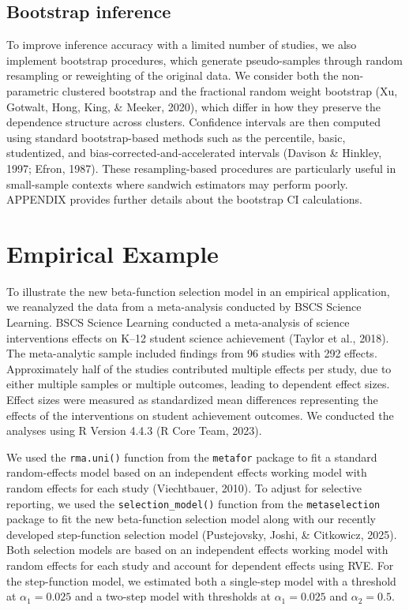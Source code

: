 \documentclass[
  american,
  man, donotrepeattitle,floatsintext]{apa7}
\begin{document}
\subsection{Bootstrap inference}\label{bootstrap-inference}

To improve inference accuracy with a limited number of studies, we also implement bootstrap procedures, which generate pseudo-samples through random resampling or reweighting of the original data. We consider both the non-parametric clustered bootstrap and the fractional random weight bootstrap (Xu, Gotwalt, Hong, King, \& Meeker, 2020), which differ in how they preserve the dependence structure across clusters. Confidence intervals are then computed using standard bootstrap-based methods such as the percentile, basic, studentized, and bias-corrected-and-accelerated intervals (Davison \& Hinkley, 1997; Efron, 1987). These resampling-based procedures are particularly useful in small-sample contexts where sandwich estimators may perform poorly. APPENDIX provides further details about the bootstrap CI calculations.

\section{Empirical Example}\label{empirical-example}

To illustrate the new beta-function selection model in an empirical application, we reanalyzed the data from a meta-analysis conducted by BSCS Science Learning. BSCS Science Learning conducted a meta-analysis of science interventions effects on K--12 student science achievement (Taylor et al., 2018). The meta-analytic sample included findings from 96 studies with 292 effects. Approximately half of the studies contributed multiple effects per study, due to either multiple samples or multiple outcomes, leading to dependent effect sizes. Effect sizes were measured as standardized mean differences representing the effects of the interventions on student achievement outcomes. We conducted the analyses using R Version 4.4.3 (R Core Team, 2023).

We used the \texttt{rma.uni()} function from the \texttt{metafor} package to fit a standard random-effects model based on an independent effects working model with random effects for each study (Viechtbauer, 2010). To adjust for selective reporting, we used the \texttt{selection\_model()} function from the \texttt{metaselection} package to fit the new beta-function selection model along with our recently developed step-function selection model (Pustejovsky, Joshi, \& Citkowicz, 2025). Both selection models are based on an independent effects working model with random effects for each study and account for dependent effects using RVE. For the step-function model, we estimated both a single-step model with a threshold at \(\alpha_1 = 0.025\) and a two-step model with thresholds at \(\alpha_1 = 0.025\) and \(\alpha_2 = 0.5\).
\end{document}
